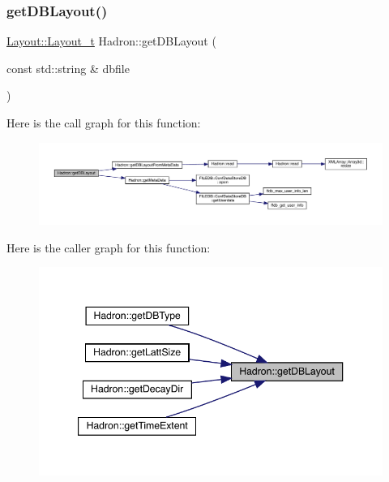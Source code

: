 \subsubsection{\texorpdfstring{getDBLayout()}{getDBLayout()}}
{\footnotesize\ttfamily \mbox{\hyperlink{structHadron_1_1Layout_1_1Layout__t}{Layout\+::\+Layout\+\_\+t}} Hadron\+::get\+D\+B\+Layout (\begin{DoxyParamCaption}\item[{const std\+::string \&}]{dbfile }\end{DoxyParamCaption})}

Here is the call graph for this function\+:\nopagebreak
\begin{figure}[H]
\begin{center}
\leavevmode
\includegraphics[width=350pt]{d1/daf/namespaceHadron_af18d764aba83c32e26a22d75ed2dfbf7_cgraph}
\end{center}
\end{figure}
Here is the caller graph for this function\+:\nopagebreak
\begin{figure}[H]
\begin{center}
\leavevmode
\includegraphics[width=347pt]{d1/daf/namespaceHadron_af18d764aba83c32e26a22d75ed2dfbf7_icgraph}
\end{center}
\end{figure}
\mbox{\label{namespaceHadron_a5f888183d0cbdadea2ebdf51020f5042}} 
